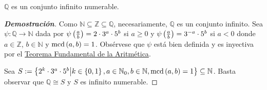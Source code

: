 \begin{proposition}
  \rm $\mathbb{Q}$ es un conjunto infinito numerable.
  \begin{proof}[\rm\textbf{Demostración}]
    Como $\mathbb{N}\subseteq\mathbb{Z}\subseteq\mathbb{Q}$, necesariamente, $\mathbb{Q}$ es un conjunto infinito. Sea $\psi:\mathbb{Q}\rightarrow\mathbb{N}$ dada por $\psi\left(\frac{a}{b}\right)=2\cdot 3^a\cdot 5^b$ si $a\geq 0$ y $\psi\left(\frac{a}{b}\right)=3^{-a}\cdot 5^b$ si $a<0$ donde $a\in\mathbb{Z}$, $b\in\mathbb{N}$ y $\text{mcd}\left(a,b\right)=1$. Obsérvese que $\psi$ está bien definida y es inyectiva por el \hyperref[Teorema Fundamental de la Aritmética]{Teorema Fundamental de la Aritmética}. 
    
    Sea $S:=\left\{2^k\cdot 3^a\cdot 5^b\middle|k\in\left\{0,1\right\},a\in\mathbb{N}_0,b\in\mathbb{N},\text{mcd}\left(a,b\right)=1\right\}\subseteq\mathbb{N}$. Basta observar que $\mathbb{Q}\cong S$ y $S$ es infinito numerable.
    
  \end{proof}
\end{proposition}

